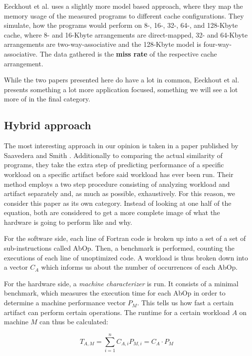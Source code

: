 \documentclass[../bachelor_paper.tex]{subfiles}
\begin{document}
Eeckhout et al. \cite{eeckhoutDesigningComputerArchitecture2003} uses a slightly more model based approach, where they map the memory usage of the measured programs to different cache configurations. They simulate, how the programs would perform on 8-, 16-, 32-, 64-, and 128-Kbyte cache, where 8- and 16-Kbyte arrangements are direct-mapped, 32- and 64-Kbyte arrangements are two-way-associative and the 128-Kbyte model is four-way-associative. The data gathered is the \textbf{miss rate} of the respective cache arrangement.

While the two papers presented here do have a lot in common, Eeckhout et al. \cite{eeckhoutDesigningComputerArchitecture2003} presents something a lot more application focused, something we will see a lot more of in the final category.


\subsection{Hybrid approach}
	\label{ch:theo/simi/hybr}
The most interesting approach in our opinion is taken in a paper published by Saavedera and Smith \cite{saavedraAnalysisBenchmarkCharacteristics1996}. Additionally to comparing the actual similarity of programs, they take the extra step of predicting performance of a specific workload on a specific artifact before said workload has ever been run. Their method employs a two step procedure consisting of analyzing workload and artifact separately and, as much as possible, exhaustively. For this reason, we consider this paper as its own category. Instead of looking at one half of the equation, both are considered to get a more complete image of what the hardware is going to perform like and why.

For the software side, each line of Fortran code is broken up into a set of a set of sub-instructions called \ac{AbOp}. Then, a benchmark is performed, counting the executions of each line of unoptimized code. A workload is thus broken down into a vector $C_A$ which informs us about the number of occurrences of each \ac{AbOp}.

For the hardware side, a \emph{machine characterizer} is run. It consists of a minimal benchmark, which measures the execution time for each \ac{AbOp} in order to determine a machine performance vector $P_M$. This tells us how fast a certain artifact can perform certain operations. The runtime for a certain workload $A$ on machine $M$ can thus be calculated:

\begin{equation}
\label{eq:theo/simi/hybr/mode}
T_{A,M} = \sum^n_{i = 1}C_{A,i}P_{M,i} = C_A \cdot P_M
\end{equation}
\end{document}
